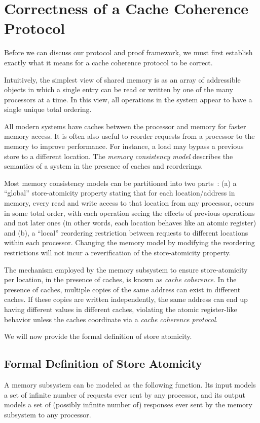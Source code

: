 \section{Correctness of a Cache Coherence Protocol}
\label{Background}

Before we can discuss our protocol and proof framework, we must first establish
exactly what it means for a cache coherence protocol to be correct. 

Intuitively, the simplest view of shared memory is as an array of addressible
objects in which a single entry can be read or written by one of the many
processors at a time.  In this view, all operations in the system appear to
have a single unique total ordering.

All modern systems have caches between the processor and memory for faster
memory access. It is often also useful to reorder requests from a processor to
the memory to improve performance. For instance, a load may bypass a previous
store to a different location. The \emph{memory consistency model} describes
the semantics of a system in the presence of caches and reorderings.

Most memory consistency models can be partitioned into two
parts~\cite{Arvind-memory-model}: (a) a ``global'' store-atomicity property
stating that for each location/address in memory, every read and write access
to that location from any processor, occurs in some total order, with
each operation seeing the effects of previous operations and not later ones (in
other words, each location behaves like an atomic register) and (b), a
``local'' reordering restriction between requests to different locations within
each processor. Changing the memory model by modifying the reordering
restrictions will not incur a reverification of the store-atomicity property.

The mechanism employed by the memory subsystem to ensure store-atomicity per
location, in the presence of caches, is known as \emph{cache coherence}. In the
presence of caches, multiple copies of the same address can exist in different
caches. If these copies are written independently, the same address can end up
having different values in different caches, violating the atomic register-like
behavior unless the caches coordinate via a \emph{cache coherence protocol}.

We will now provide the formal definition of store atomicity.

\subsection{Formal Definition of Store Atomicity}
A memory subsystem can be modeled as the following function. Its input models a
set of infinite number of requests ever sent by any processor, and its output
models a set of (possibly infinite number of) responses ever sent by the memory
subsystem to any processor.

